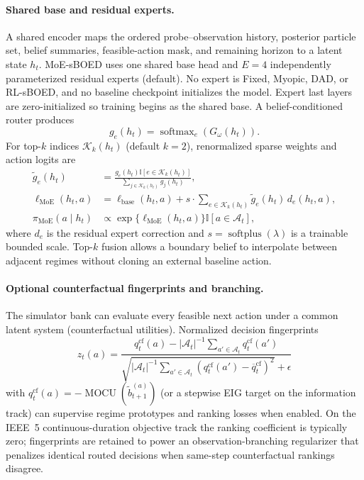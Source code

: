 \documentclass[11pt]{article}
\begin{document}
\paragraph{Shared base and residual experts.}
A shared encoder maps the ordered probe--observation history, posterior
particle set, belief summaries, feasible-action mask, and remaining horizon to
a latent state \(h_t\). MoE-sBOED uses one shared base head and \(E=4\)
independently parameterized residual experts (default). No expert is Fixed,
Myopic, DAD, or RL-sBOED, and no baseline checkpoint initializes the model.
Expert last layers are zero-initialized so training begins as the shared base.
A belief-conditioned router produces
\begin{equation}
g_e(h_t)=\operatorname{softmax}_e(G_\omega(h_t)).
\label{eq:moe_learned_router}
\end{equation}
For top-\(k\) indices \(\mathcal K_k(h_t)\) (default \(k=2\)), renormalized
sparse weights and action logits are
\begin{align}
\widetilde g_e(h_t)&=
\frac{g_e(h_t)\mathbb I[e\in\mathcal K_k(h_t)]}
{\sum_{j\in\mathcal K_k(h_t)}g_j(h_t)},\\
\ell_{\mathrm{MoE}}(h_t,a)&=
\ell_{\mathrm{base}}(h_t,a)
+
s\cdot
\sum_{e\in\mathcal K_k(h_t)}\widetilde g_e(h_t)\,
d_e(h_t,a),\\
\pi_{\mathrm{MoE}}(a\mid h_t)&\propto
\exp\{\ell_{\mathrm{MoE}}(h_t,a)\}
\mathbb I[a\in\mathcal A_t],
\label{eq:moe_policy}
\end{align}
where \(d_e\) is the residual expert correction and
\(s=\operatorname{softplus}(\lambda)\) is a trainable bounded scale.
Top-\(k\) fusion allows a boundary belief to interpolate between adjacent
regimes without cloning an external baseline action.

\paragraph{Optional counterfactual fingerprints and branching.}
The simulator bank can evaluate every feasible next action under a common
latent system (counterfactual utilities). Normalized decision fingerprints
\begin{equation}
z_t(a)=\frac{q_t^{\mathrm{cf}}(a)-
|\mathcal A_t|^{-1}\sum_{a'\in\mathcal A_t}q_t^{\mathrm{cf}}(a')}
{\sqrt{|\mathcal A_t|^{-1}\sum_{a'\in\mathcal A_t}
\left(q_t^{\mathrm{cf}}(a')-\overline q_t^{\mathrm{cf}}\right)^2}+\epsilon}
\label{eq:moe_fingerprint}
\end{equation}
with \(q_t^{\mathrm{cf}}(a)=-\operatorname{MOCU}(\widetilde b_{t+1}^{(a)})\)
(or a stepwise EIG target on the information track) can supervise regime
prototypes and ranking losses when enabled. On the IEEE~5 continuous-duration
objective track the ranking coefficient is typically zero; fingerprints are retained to
power an observation-branching regularizer that penalizes identical routed
decisions when same-step counterfactual rankings disagree.
\end{document}
